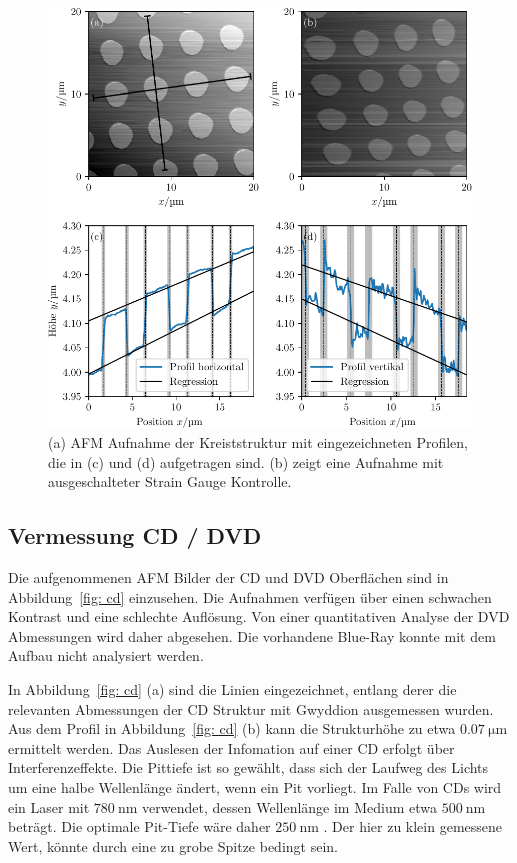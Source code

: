 \begin{figure}
  \centering
  \includegraphics[scale = 1]{../analysis/data/nanostruktur_kreise/kreise_profile.pdf}
  \caption{(a) AFM Aufnahme der Kreiststruktur mit eingezeichneten Profilen, die in (c) und (d) aufgetragen sind.
    (b) zeigt eine Aufnahme mit ausgeschalteter Strain Gauge Kontrolle.}
  \label{fig: kreise_profil}
\end{figure}

\FloatBarrier
\subsection{Vermessung CD / DVD}
Die aufgenommenen AFM Bilder der CD und DVD Oberflächen sind in Abbildung~\ref{fig: cd} einzusehen.
Die Aufnahmen verfügen über einen schwachen Kontrast und eine schlechte Auflösung. Von einer
quantitativen Analyse der DVD Abmessungen wird daher abgesehen. Die vorhandene Blue-Ray
konnte mit dem Aufbau nicht analysiert werden.

In Abbildung~\ref{fig: cd} (a) sind die Linien eingezeichnet, entlang derer die relevanten Abmessungen der
CD Struktur mit Gwyddion ausgemessen wurden. Aus dem Profil in Abbildung~\ref{fig: cd} (b) kann die
Strukturhöhe zu etwa $\SI{0.07}{\micro\meter}$ ermittelt werden. Das Auslesen der Infomation auf einer
CD erfolgt über Interferenzeffekte. Die Pittiefe ist so gewählt, dass sich der Laufweg des Lichts
um eine halbe Wellenlänge ändert, wenn ein Pit vorliegt. Im Falle von CDs wird ein Laser mit $\SI{780}{\nano\meter}$
verwendet, dessen Wellenlänge im Medium etwa $\SI{500}{\nano\meter}$ beträgt. Die optimale Pit-Tiefe wäre daher
$\SI{250}{\nano\meter}$ \cite{cd_theorie}. Der hier zu klein gemessene Wert, könnte durch eine zu grobe Spitze
bedingt sein.

